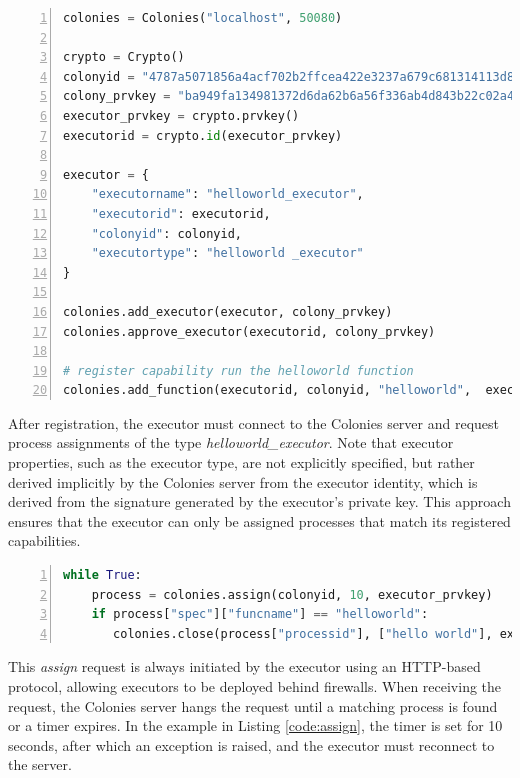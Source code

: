 \documentclass{article}
\begin{document}
\begin{lstlisting}[showstringspaces=false, frame=lines, numbers=left, numberstyle=\scriptsize, backgroundcolor=\color{background}, basicstyle=\small, label=code:regexecutor, language=Python, caption=Register an executor to a colony in Python.]
colonies = Colonies("localhost", 50080)

crypto = Crypto()
colonyid = "4787a5071856a4acf702b2ffcea422e3237a679c681314113d86139461290cf4"
colony_prvkey = "ba949fa134981372d6da62b6a56f336ab4d843b22c02a4257dcf7d0d73097514"
executor_prvkey = crypto.prvkey()
executorid = crypto.id(executor_prvkey)

executor = {
    "executorname": "helloworld_executor",
    "executorid": executorid,
    "colonyid": colonyid,
    "executortype": "helloworld _executor"
}

colonies.add_executor(executor, colony_prvkey)
colonies.approve_executor(executorid, colony_prvkey)

# register capability run the helloworld function
colonies.add_function(executorid, colonyid, "helloworld",  executor_prvkey)
\end{lstlisting}

After registration, the executor must connect to the Colonies server and request process assignments of the type \emph{helloworld\_executor}. Note that executor properties, such as the executor type, are not explicitly specified, but rather derived implicitly by the Colonies server from the executor identity, which is derived from the signature generated by the executor's private key. This approach ensures that the executor can only be assigned processes that match its registered capabilities.

\begin{lstlisting}[showstringspaces=false, frame=lines, numbers=left, numberstyle=\scriptsize, backgroundcolor=\color{background}, basicstyle=\small, language=Python, label=code:assign, caption=Assigning and executing a process in Python.]
while True:
    process = colonies.assign(colonyid, 10, executor_prvkey)
    if process["spec"]["funcname"] == "helloworld":
       colonies.close(process["processid"], ["hello world"], executor_prvkey)
\end{lstlisting}

This \emph{assign} request is always initiated by the executor using an HTTP-based protocol, allowing executors to be deployed behind firewalls. When receiving the request, the Colonies server hangs the request until a matching process is found or a timer expires. In the example in Listing \ref{code:assign}, the timer is set for 10 seconds, after which an exception is raised, and the executor must reconnect to the server.
\end{document}

